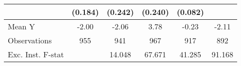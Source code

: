 {\begin{tabular}{l*{5}{c}}
            &     (0.184)         &     (0.242)         &     (0.240)         &     (0.082)         &                     \\
\midrule
Mean Y      &       -2.00         &       -2.06         &        3.78         &       -0.23         &       -2.11         \\
Observations&         955         &         941         &         967         &         917         &         892         \\
Exc. Inst. F-stat&                     &      14.048         &      67.671         &      41.285         &      91.168         \\
\bottomrule
\end{tabular}
}
